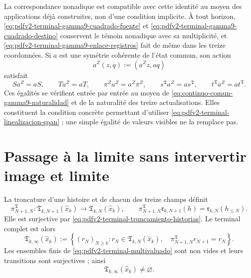 La correspondance nonadique est compatible avec cette identité au moyen des applications déjà construites, non d'une condition implicite. À tout horizon, \eqref{eq:pdfv2-terminal-gamma9-cuadrado-fuente} et \eqref{eq:pdfv2-terminal-gamma9-cuadrado-destino} conservent le témoin nonadique avec sa multiplicité, et \eqref{eq:pdfv2-terminal-gamma9-enlace-registros} fait de même dans les treize coordonnées. Si \(a\) est une symétrie cohérente de l'état commun, son action
\[
 a^Z(z,q):=(a^Zz,aq)
\]
satisfait
\begin{equation}
\label{eq:pdfv2-terminal-gamma9-equivarianza-completa}
 S a^Z=aS,\qquad T a^Z=aT,\qquad
 \pi^Za^Z=a^Z\pi^Z,\qquad
 s^{\mathfrak T}a^Z=as^{\mathfrak T},\qquad
 t^{\mathfrak T}a^Z=at^{\mathfrak T}.
\end{equation}
Ces égalités se vérifient entrée par entrée au moyen de \eqref{eq:continuo-comun-gamma9-naturalidad} et de la naturalité des treize actualisations. Elles constituent la condition concrète permettant d'utiliser \eqref{eq:pdfv2-terminal-linealizacion-span} ; une simple égalité de valeurs visibles ne la remplace pas.

\section{Passage à la limite sans intervertir image et limite}

La troncature d'une histoire et de chacun des treize champs définit
\begin{equation}
\label{eq:pdfv2-terminal-transicion-horizonte}
 \pi^{\mathfrak T}_{N+1,N}:
 \mathfrak T_{k,N+1}(\widehat x_k)\longrightarrow
 \mathfrak T_{k,N}(\widehat x_k),
 \qquad
 \pi^{\mathfrak T}_{N+1,N}\mathfrak r_{k,N+1}(h)
 =\mathfrak r_{k,N}(h_{\leq N}).
\end{equation}
Elle est surjective par \eqref{eq:pdfv2-terminal-truncamiento-historias}. Le terminal complet est alors
\begin{equation}
\label{eq:pdfv2-terminal-limite-inverso}
 \mathfrak T_{k,\infty}(\widehat x_k)
 :=\left\{(r_N)_{N\geq k}:
 r_N\in\mathfrak T_{k,N}(\widehat x_k),\quad
 \pi^{\mathfrak T}_{N+1,N}r_{N+1}=r_N\right\}.
\end{equation}
Les ensembles finis de \eqref{eq:pdfv2-terminal-multivaluado} sont non vides et leurs transitions sont surjectives ; ainsi
\begin{equation}
\label{eq:pdfv2-terminal-limite-no-vacio}
 \mathfrak T_{k,\infty}(\widehat x_k)\neq\varnothing.
\end{equation}

